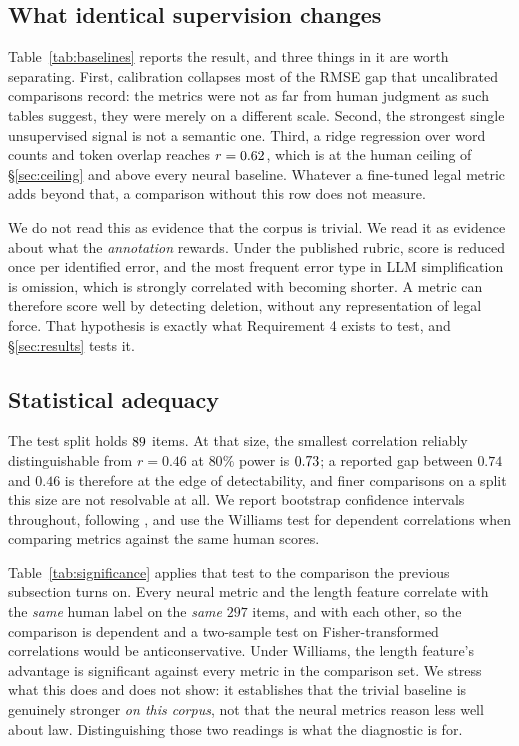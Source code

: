 \documentclass[11pt]{article}
\begin{document}
\subsection{What identical supervision changes}

Table~\ref{tab:baselines} reports the result, and three things in it are worth
separating. First, calibration collapses most of the RMSE gap that uncalibrated
comparisons record: the metrics were not as far from human judgment as such
tables suggest, they were merely on a different scale. Second, the strongest
single unsupervised signal is not a semantic one. Third, a ridge regression over
word counts and token overlap reaches $r=0.62$, which is at the human ceiling
of \S\ref{sec:ceiling} and above every neural baseline. Whatever a fine-tuned
legal metric adds beyond that, a comparison without this row does not measure.

We do not read this as evidence that the corpus is trivial. We read it as
evidence about what the \emph{annotation} rewards. Under the published rubric,
score is reduced once per identified error, and the most frequent error type in
LLM simplification is omission, which is strongly correlated with becoming
shorter. A metric can therefore score well by detecting deletion, without any
representation of legal force. That hypothesis is exactly what Requirement 4
exists to test, and \S\ref{sec:results} tests it.

\subsection{Statistical adequacy}

The test split holds $89$ items. At that size, the smallest correlation
reliably distinguishable from $r=0.46$ at $80\%$ power is $0.73$; a
reported gap between $0.74$ and $0.46$ is therefore at the edge of
detectability, and finer comparisons on a split this size are not resolvable at
all. We report bootstrap confidence intervals throughout, following
\citet{deutsch2021statistical}, and use the Williams test for dependent
correlations \citep{graham2014williams} when comparing metrics against the same
human scores.

Table~\ref{tab:significance} applies that test to the comparison the previous
subsection turns on. Every neural metric and the length feature correlate with
the \emph{same} human label on the \emph{same} $297$ items, and with each other,
so the comparison is dependent and a two-sample test on Fisher-transformed
correlations would be anticonservative. Under Williams, the length feature's
advantage is significant against every metric in the comparison set. We stress
what this does and does not show: it establishes that the trivial baseline is
genuinely stronger \emph{on this corpus}, not that the neural metrics reason
less well about law. Distinguishing those two readings is what the diagnostic is
for.
\end{document}
